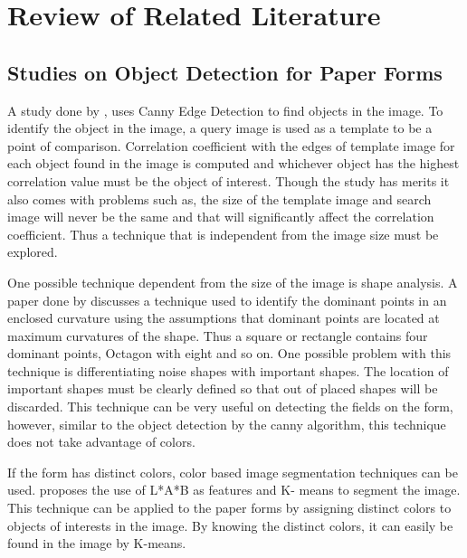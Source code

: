%
%
%                 

\chapter{Review of Related Literature}
\label{sec:relatedlit}

\section{Studies on Object Detection for Paper Forms}

A study done by , uses Canny Edge Detection to find objects in the image. To identify the object in the image, a query image is used as a template to be a point of comparison. Correlation coefficient with the edges of template image for each object found in the image is computed and whichever object has the highest correlation value must be the object of interest. Though the study has merits it also comes with problems such as, the size of the template image and search image will never be the same and that will significantly affect the correlation coefficient.  Thus a technique that is independent from the image size must be explored. 


One possible technique dependent from the size of the image is shape analysis.  A paper done by  discusses a technique used to identify  the dominant points in an enclosed curvature using the assumptions that dominant points are located at maximum curvatures of the shape. Thus a square or rectangle contains four dominant points, Octagon with eight and so on.  One possible problem with this technique is differentiating noise shapes with important shapes. The location of important shapes must be clearly defined so that out of placed shapes will be discarded.  This technique can be very useful on detecting the fields on the form, however, similar to the object detection by the canny algorithm,  this technique does not take advantage of colors.


If the form has distinct colors, color based image segmentation techniques can be used. proposes the use of  L*A*B as features and K- means to segment the image. This technique can be applied to the paper forms by assigning distinct colors to objects of interests in the image.  By knowing the distinct colors, it can easily be found in the image by K-means.  



